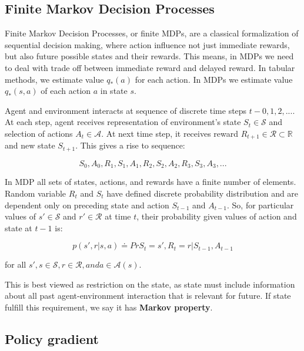 \subsection{Finite Markov Decision Processes}

Finite Markov Decision Processes, or finite MDPs, are a classical formalization of sequential decision making, where action influence not just immediate rewards, but also future possible states and their rewards. This means, in MDPs we need to deal with trade off between immediate reward and delayed reward. In tabular methods, we estimate value $q_*(a)$ for each action. In MDPs we estimate value $q_*(s, a)$ of each action $a$ in state $s$.\cite{RL}

Agent and environment interacts at sequence of discrete time steps $t - 0,1,2,...$. At each step, agent receives representation of environment's state $S_t \in \mathcal{S}$ and selection of actions $A_t \in \mathcal{A}$. At next time step, it receives reward $R_{t+1} \in \mathcal{R} \subset \mathbb{R}$ and new  state $S_{t+1}$. This gives a rise to sequence:

\begin{equation}
S_0, A_0, R_1, S_1, A_1, R_2, S_2, A_2, R_3, S_3, A_3,... 
\end{equation}

In MDP all sets of states, actions, and rewards have a finite number of elements. Random variable $R_t$ and $S_t$ have defined discrete probability distribution and are dependent only on preceding state and action $S_{t-1}$ and $A_{t-1}$. So, for particular values of $s' \in \mathcal{S}$ and $r' \in \mathcal{R}$ at time $t$, their probability given values of action and state at $t-1$ is:

\begin{equation}
p(s',r|s,a) \doteq Pr{S_t=s',R_t=r|S_{t-1}, A_{t-1}}
\end{equation}

for all $s', s \in \mathcal{S}, r \in \mathcal{R}, and a \in \mathcal{A}(s)$.

This is best viewed as restriction on the state, as state must include information about all past agent-environment interaction that is relevant for future. If state fulfill this requirement, we say it has \textbf{Markov property}.\cite{RL}

\subsection{Policy gradient}

